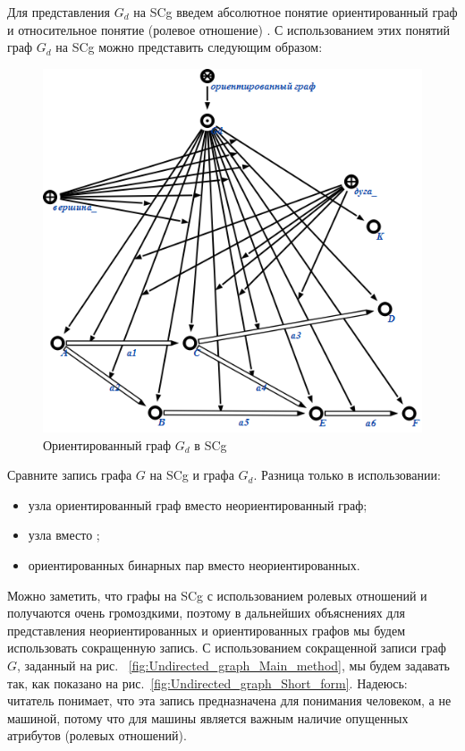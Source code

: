 Для представления $G_d$ на SCg введем абсолютное понятие
ориентированный граф и относительное понятие (ролевое отношение)
. С использованием этих понятий граф $G_d$ на SCg можно
представить следующим образом:

\begin{figure}[h]
  \centering
  \includegraphics[scale=0.6]{images/2/Directed_graph}
  \caption{Ориентированный граф $G_d$ в SCg}
  \label{fig:Directed_graph}
\end{figure}

Сравните запись графа $G$ на SCg и графа $G_d$. Разница только в
использовании:

\begin{itemize}
\item узла ориентированный граф вместо неориентированный граф;
\item узла  вместо ;
\item ориентированных бинарных пар вместо неориентированных.
\end{itemize}

Можно заметить, что графы на SCg с использованием ролевых отношений
 и  получаются очень громоздкими, поэтому в
дальнейших объяснениях для представления неориентированных и
ориентированных графов мы будем использовать сокращенную запись. С
использованием сокращенной записи граф $G$, заданный на рис.
~\ref{fig:Undirected_graph_Main_method}, мы будем задавать так, как
показано на рис.~\ref{fig:Undirected_graph_Short_form}. Надеюсь:
читатель понимает, что эта запись предназначена для понимания
человеком, а не машиной, потому что для машины является важным наличие
опущенных атрибутов (ролевых отношений).

